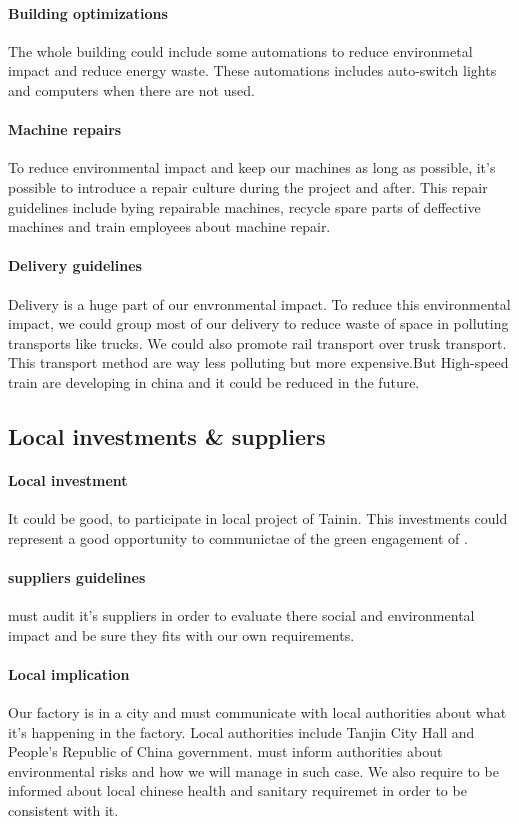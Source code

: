 \paragraph{Building optimizations} The whole building could include some automations to reduce environmetal impact and reduce energy waste.
These automations includes auto-switch lights and computers when there are not used.

\paragraph{Machine repairs} To reduce environmental impact and keep our machines as long as possible, it's possible to introduce a repair culture during the project and after.
This repair guidelines include bying repairable machines, recycle spare parts of deffective machines and train employees about machine repair.

\paragraph{Delivery guidelines} Delivery is a huge part of our envronmental impact.
To reduce this environmental impact, we could group most of our delivery to reduce waste of space in polluting transports like trucks.
We could also promote rail transport over trusk transport. This transport method are way less polluting but more expensive.But High-speed train are developing in china and it could be reduced in the future.

\subsection{Local investments \& suppliers}

\paragraph{Local investment} It could be good, to participate in local project of Tainin.
This investments could represent a good opportunity to communictae of the green engagement of \moldco.

\paragraph{suppliers guidelines} \moldco must audit it's suppliers in order to evaluate there social and environmental impact and be sure they fits with our own requirements.

\paragraph{Local implication} Our factory is in a city and \moldco must communicate with local authorities about what it's happening in the factory.
Local authorities include Tanjin City Hall and People's Republic of China government.
\moldco must inform authorities about environmental risks and how we will manage in such case.
We also require to be informed about local chinese health and sanitary requiremet in order to be consistent with it.